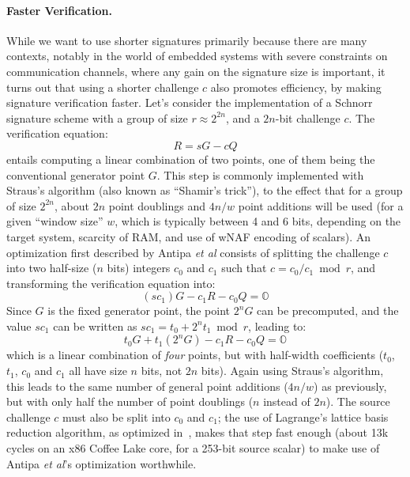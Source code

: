 \documentclass{llncs}
\newcommand{\neutral}{\mathbb{O}}
\begin{document}
\paragraph{Faster Verification.}
While we want to use shorter signatures primarily because there are many
contexts, notably in the world of embedded systems with severe
constraints on communication channels, where any gain on the signature
size is important, it turns out that using a shorter challenge $c$ also
promotes efficiency, by making signature verification faster. Let's
consider the implementation of a Schnorr signature scheme with a group
of size $r \approx 2^{2n}$, and a $2n$-bit challenge $c$. The verification
equation:
\begin{equation*}
    R = sG - cQ
\end{equation*}
entails computing a linear combination of two points, one of them being
the conventional generator point $G$. This step is commonly implemented
with Straus's algorithm\cite{Str1964} (also known as ``Shamir's
trick''), to the effect that for a group of size $2^{2n}$, about $2n$
point doublings and $4n/w$ point additions will be used (for a given
``window size'' $w$, which is typically between 4 and 6 bits, depending
on the target system, scarcity of RAM, and use of wNAF encoding of
scalars). An optimization first described by Antipa \emph{et
al}\cite{AntBroGalLamStrVan2005} consists of splitting the challenge
$c$ into two half-size ($n$ bits) integers $c_0$ and $c_1$ such that
$c = c_0/c_1 \bmod r$, and transforming the verification equation into:
\begin{equation*}
    (sc_1) G - c_1 R - c_0 Q = \neutral
\end{equation*}
Since $G$ is the fixed generator point, the point $2^n G$ can be precomputed,
and the value $sc_1$ can be written as $sc_1 = t_0 + 2^n t_1 \bmod r$,
leading to:
\begin{equation*}
    t_0 G + t_1 (2^n G) - c_1 R - c_0 Q = \neutral
\end{equation*}
which is a linear combination of \emph{four} points, but with half-width
coefficients ($t_0$, $t_1$, $c_0$ and $c_1$ all have size $n$ bits, not
$2n$ bits). Again using Straus's algorithm, this leads to the same
number of general point additions ($4n/w$) as previously, but with only
half the number of point doublings ($n$ instead of $2n$). The source
challenge $c$ must also be split into $c_0$ and $c_1$; the use of
Lagrange's lattice basis reduction algorithm, as optimized
in~\cite{Por2020-2}, makes that step fast enough (about 13k cycles on an
x86 Coffee Lake core, for a 253-bit source scalar) to make use of Antipa
\emph{et al}'s optimization worthwhile.
\end{document}
